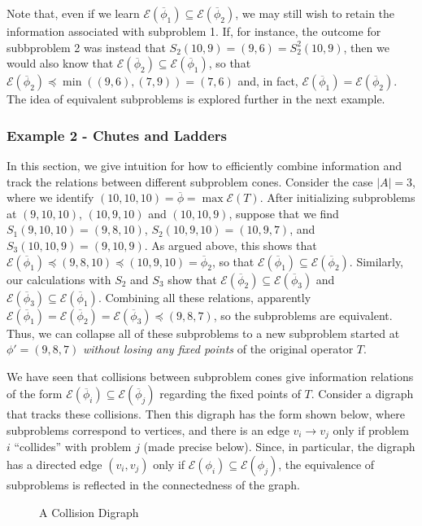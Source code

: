 \documentclass[11pt,reqno]{amsart}
\theoremstyle{definition}
\numberwithin{equation}{section}
\newcommand{\ol}{\overline}
\newcommand{\pre}{\phi}
\newcommand{\sub}{\subseteq}
\newcommand{\fix}{\mathcal{E}}
\newcommand{\peq}{\preceq}
\newcommand{\toppre}{\ol{\pre}}
\begin{document}
Note that, even if we learn $\fix(\toppre_1) \sub \fix(\toppre_2)$, we may still wish to retain the information associated with subproblem 1. 
If, for instance, the outcome for subbproblem 2 was instead that $S_2(10,9) =  (9,6) = S_2^2(10,9)$, then we would also know that $\fix(\toppre_2) \sub \fix(\toppre_1)$, so that $\fix(\toppre_2) \peq \min((9,6),(7,9)) = (7,6)$ and, in fact, $\fix(\toppre_1) = \fix(\toppre_2)$.
The idea of equivalent subproblems is explored further in the next example. 

\subsubsection{Example 2 - Chutes and Ladders}
In this section, we give intuition for how to efficiently combine information and track the relations between different subproblem cones. 
Consider the case $|A| = 3$, where we identify $(10,10,10) = \toppre = \max \fix(T)$. 
After initializing subproblems at $(9,10,10)$, $(10,9,10)$ and $(10,10,9)$, suppose that we find $S_1(9,10,10) = (9,8,10)$, $S_2(10,9,10) = (10,9,7)$, and $S_3(10,10,9) = (9,10,9)$. 
As argued above, this shows that $\fix(\toppre_1) \peq (9,8,10) \peq (10,9,10) = \toppre_2$, so that $\fix(\toppre_1) \sub \fix(\toppre_2)$. 
Similarly, our calculations with $S_2$ and $S_3$ show that $\fix(\toppre_2) \sub \fix(\toppre_3)$ and $\fix(\toppre_3) \sub \fix(\toppre_1)$. 
Combining all these relations, apparently $\fix(\toppre_1) = \fix(\toppre_2) = \fix(\toppre_3) \peq (9,8,7)$, so the subproblems are equivalent.  
Thus, we can collapse all of these subproblems to a new subproblem started at $\pre' = (9,8,7)$ \emph{without losing any fixed points} of the original operator $T$. 

We have seen that collisions between subproblem cones give information relations of the form $\fix(\toppre_i) \sub \fix(\toppre_j)$ regarding the fixed points of $T$.
Consider a digraph that tracks these collisions.
Then this digraph has the form shown below, where subproblems correspond to vertices, and there is an edge $v_i \to v_j$ only if problem $i$ ``collides'' with problem $j$ (made precise below). 
Since, in particular, the digraph has a directed edge $(v_i,v_j)$ only if $\fix(\pre_i) \sub \fix(\pre_j)$, the equivalence of subproblems is reflected in the connectedness of the graph. 

\begin{figure} \label{fig:digraph}
\caption{A Collision Digraph}
\end{figure}
\end{document}
